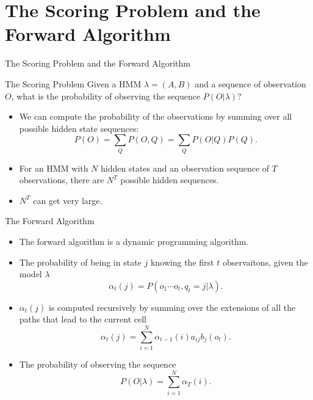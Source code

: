 \documentclass{beamer}
\begin{document}
\section{The Scoring Problem and the Forward Algorithm}
\begin{frame}{The Scoring Problem and the Forward Algorithm}
	\begin{block}{The Scoring Problem}
		Given a HMM $\lambda = (A,B)$ and a sequence of observation $O$, what is the probability of observing the sequence $P(O \vert \lambda)$?
	\end{block}
	\begin{itemize}
		\item We can compute the probability of the observations by summing over all possible hidden state sequences:
		$$P(O) = \sum_Q P(O, Q) = \sum_Q P(O\vert Q) P(Q).$$
		\item For an HMM with $N$ hidden states and an observation sequence of $T$ observations, there are $N^T$ possible hidden sequences.
		\item $N^T$ can get very large.
	\end{itemize}
\end{frame}

\begin{frame}{The Forward Algorithm}
	\begin{itemize}
		\item The forward algorithm is a dynamic programming algorithm. 
		\item The probability of being in state $j$ knowing the first $t$ observaitons, given the model $\lambda$
		\begin{equation}
			\alpha_t(j) = P(o_1\cdots o_t, q_t = j \vert \lambda).
		\end{equation}
		\item $\alpha_t(j)$ is computed recursively by summing over the extensions of all the paths that lead to the current cell
		\begin{equation}
			\alpha_t(j) = \sum_{i=1}^N \alpha_{t-1}(i) a_{ij} b_j (o_t).
		\end{equation}
		\item The probability of observing the sequence
		\begin{equation}
			P(O \vert \lambda) = \sum_{i=1}^N \alpha_T(i).
		\end{equation}
	\end{itemize}
\end{frame}

\end{document}
